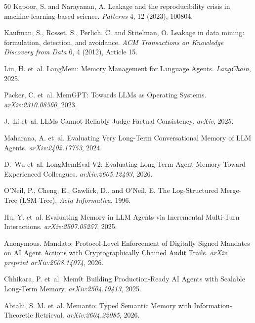 \documentclass[sigconf,nonacm]{acmart}
\begin{document}
\begin{thebibliography}{50}
Kapoor, S. and Narayanan, A. Leakage and the reproducibility crisis in machine-learning-based science. \emph{Patterns} 4, 12 (2023), 100804.

Kaufman, S., Rosset, S., Perlich, C. and Stitelman, O. Leakage in data mining: formulation, detection, and avoidance. \emph{ACM Transactions on Knowledge Discovery from Data} 6, 4 (2012), Article 15.

Liu, H. et~al.
\newblock LangMem: Memory Management for Language Agents.
\newblock \emph{LangChain}, 2025.

Packer, C. et~al.
\newblock MemGPT: Towards LLMs as Operating Systems.
\newblock \emph{arXiv:2310.08560}, 2023.

J.~Li et~al.
\newblock LLMs Cannot Reliably Judge Factual Consistency.
\newblock \emph{arXiv}, 2025.

Maharana, A. et~al.
\newblock Evaluating Very Long-Term Conversational Memory of LLM Agents.
\newblock \emph{arXiv:2402.17753}, 2024.

D.~Wu et~al.
\newblock LongMemEval-V2: Evaluating Long-Term Agent Memory Toward Experienced Colleagues.
\newblock \emph{arXiv:2605.12493}, 2026.

O'Neil, P., Cheng, E., Gawlick, D., and O'Neil, E.
\newblock The Log-Structured Merge-Tree (LSM-Tree).
\newblock \emph{Acta Informatica}, 1996.

Hu, Y. et~al.
\newblock Evaluating Memory in LLM Agents via Incremental Multi-Turn Interactions.
\newblock \emph{arXiv:2507.05257}, 2025.

Anonymous.
\newblock Mandato: Protocol-Level Enforcement of Digitally Signed Mandates on AI Agent Actions with Cryptographically Chained Audit Trails.
\newblock \emph{arXiv preprint arXiv:2608.14074}, 2026.

Chhikara, P. et~al.
\newblock Mem0: Building Production-Ready AI Agents with Scalable Long-Term Memory.
\newblock \emph{arXiv:2504.19413}, 2025.

Abtahi, S. M. et~al.
\newblock Memanto: Typed Semantic Memory with Information-Theoretic Retrieval.
\newblock \emph{arXiv:2604.22085}, 2026.


\end{thebibliography}
\end{document}
